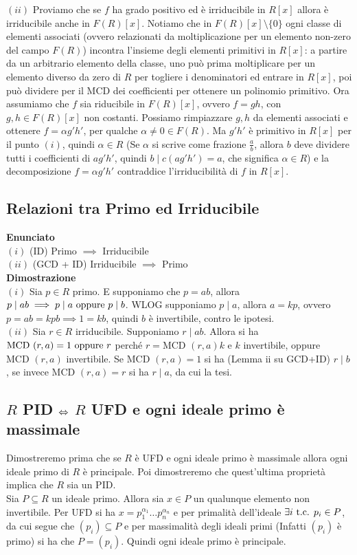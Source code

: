 \documentclass[a4paper,GeneralMath,NoNotes]{stdmdoc}
\newcommand{\Enunciato}{\vskip 0.05cm \noindent \textbf{Enunciato} \\ }
\renewcommand{\Dimostrazione}{\vskip 0.05cm \noindent \textbf{Dimostrazione} \\ }
\newcommand{\MCD}{\text{MCD }}
\begin{document}
		$(ii)$ \frdx Proviamo che se $f$ ha grado positivo ed è irriducibile in $R[x]$ allora è irriducibile anche in $F(R)[x]$. Notiamo che in $F(R)[x] \setminus \{0\}$ ogni classe di elementi associati (ovvero relazionati da moltiplicazione per un elemento non-zero del campo $F(R)$) incontra l'insieme degli elementi primitivi in $R[x]$: a partire da un arbitrario elemento della classe, uno può prima moltiplicare per un elemento diverso da zero di $R$ per togliere i denominatori ed entrare in $R[x]$, poi può dividere per il MCD dei coefficienti per ottenere un polinomio primitivo. Ora assumiamo che $f$ sia riducibile in $F(R)[x]$, ovvero $f = gh$, con $g, h \in F(R)[x]$ non costanti. Possiamo rimpiazzare $g, h$ da elementi associati e ottenere $f = \alpha g' h'$, per qualche $\alpha \neq 0 \in F(R)$. Ma $g'h'$ è primitivo in $R[x]$ per il punto $(i)$, quindi $\alpha \in R$ (Se $\alpha$ si scrive come frazione $\frac{a}{b}$, allora $b$ deve dividere tutti i coefficienti di $ag'h'$, quindi $b \mid c(ag'h') = a$, che significa $\alpha \in R$) e la decomposizione $f = \alpha g'h'$ contraddice l'irriducibilità di $f$ in $R[x]$.

	\subsection{Relazioni tra Primo ed Irriducibile}
	\Enunciato
		$(i)$ (ID) Primo $\implies$ Irriducibile \\
		$(ii)$ (GCD + ID) Irriducibile $\implies$ Primo \\
	\Dimostrazione
		$(i)$ Sia $p \in R$ primo. E supponiamo che $p = ab$, allora $p \mid ab \implies p \mid a \text{ oppure } p \mid b$. WLOG supponiamo $p \mid a$, allora $a = kp$, ovvero $p = ab = kpb \implies 1 = kb$, quindi $b$ è invertibile, contro le ipotesi. \\
		$(ii)$ Sia $r \in R$ irriducibile. Supponiamo $r \mid ab$. Allora si ha $\MCD(r,a) = 1 \opp r$ perché $r = \MCD(r,a) k$ e $k$ invertibile, oppure $\MCD(r,a)$ invertibile. Se $\MCD(r,a) = 1$ si ha (Lemma ii su GCD+ID) $r \mid b$, se invece $\MCD(r,a) = r$ si ha $r \mid a$, da cui la tesi. \\

	\subsection{$R$ PID $\Leftrightarrow$ $R$ UFD e ogni ideale primo è massimale}
	Dimostreremo prima che se $R$ è UFD e ogni ideale primo è massimale allora ogni ideale primo di $R$ è principale. Poi dimostreremo che quest'ultima proprietà implica che $R$ sia un PID. \\
	Sia $P \subseteq R$ un ideale primo. Allora sia $x \in P$ un qualunque elemento non invertibile. Per UFD si ha $x = p_1^{\alpha_1} \ldots p_n^{\alpha_n}$ e per primalità dell'ideale $\exists i \mbox{ t.c. } p_i \in P$, da cui segue che $(p_i) \subseteq P$ e per massimalità degli ideali primi (Infatti $(p_i)$ è primo) si ha che $P = (p_i)$. Quindi ogni ideale primo è principale. \\
\end{document}
